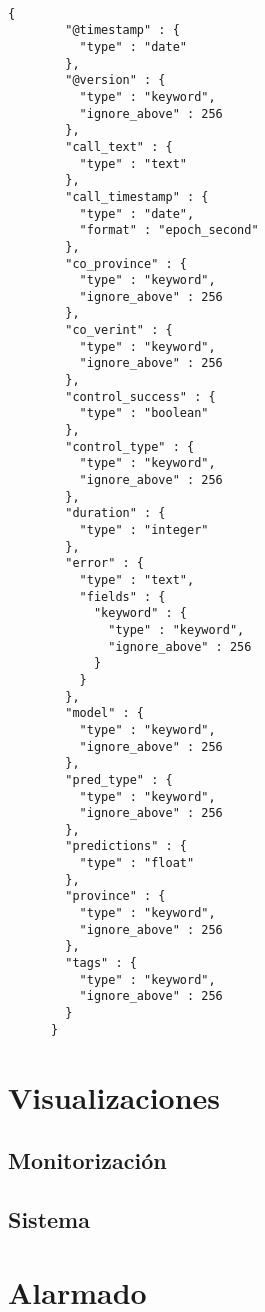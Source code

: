 \begin{verbatim}

{
        "@timestamp" : {
          "type" : "date"
        },
        "@version" : {
          "type" : "keyword",
          "ignore_above" : 256
        },
        "call_text" : {
          "type" : "text"
        },
        "call_timestamp" : {
          "type" : "date",
          "format" : "epoch_second"
        },
        "co_province" : {
          "type" : "keyword",
          "ignore_above" : 256
        },
        "co_verint" : {
          "type" : "keyword",
          "ignore_above" : 256
        },
        "control_success" : {
          "type" : "boolean"
        },
        "control_type" : {
          "type" : "keyword",
          "ignore_above" : 256
        },
        "duration" : {
          "type" : "integer"
        },
        "error" : {
          "type" : "text",
          "fields" : {
            "keyword" : {
              "type" : "keyword",
              "ignore_above" : 256
            }
          }
        },
        "model" : {
          "type" : "keyword",
          "ignore_above" : 256
        },
        "pred_type" : {
          "type" : "keyword",
          "ignore_above" : 256
        },
        "predictions" : {
          "type" : "float"
        },
        "province" : {
          "type" : "keyword",
          "ignore_above" : 256
        },
        "tags" : {
          "type" : "keyword",
          "ignore_above" : 256
        }
      }
\end{verbatim}
\section{Visualizaciones}

\subsection{Monitorización}
\subsection{Sistema}

\section{Alarmado}


